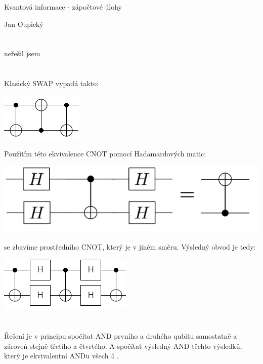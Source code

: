 \documentclass[12pt, a4paper]{article}
\begin{document}
\begin{center}
\large Kvantová informace - zápočtové úlohy

\normalsize Jan Oupický
\end{center}
\vspace{1\baselineskip}

\section{}
neřešil jsem

\section{}
Klasický SWAP vypadá takto:\\
\begin{center}
\includegraphics{2/swap.png}
\end{center}
Použítím této ekvivalence CNOT pomocí Hadamardových matic:\\
\begin{center}
\includegraphics{2/hadamard.png}
\end{center}
se zbavíme prostředního CNOT, který je v jiném směru. Výsledný obvod je tedy:
\begin{center}
\includegraphics{2/final.png}
\end{center}

\section{}
Řešení je v principu spočítat AND prvního a druhého qubitu samostatně a zároveň stejně třetího a čtvrtého. A spočítat výsledný AND těchto výsledků, který je ekvivalentní ANDu všech 4 .
\end{document}
